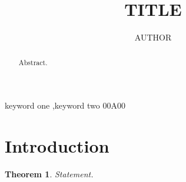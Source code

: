 \documentclass[preprint,12pt]{elsarticle}
\newtheorem{theorem}{Theorem}[section]
\begin{document}
\begin{frontmatter}
\title{{{TITLE}}}
\author[a]{{{AUTHOR}}}
\begin{abstract}
Abstract.
\end{abstract}
\begin{keyword}
keyword one \sep keyword two
\MSC[2020] 00A00
\end{keyword}
\end{frontmatter}

\section{Introduction}
\begin{theorem}
Statement.
\end{theorem}



\end{document}
